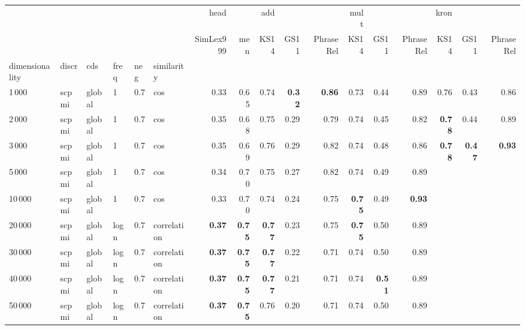 \begin{tabular}{llllllrrrrrrrrrrr}
\toprule
      &       &        &   &     &             &      head &       &   add &       &           &  mult &       &           &  kron &       &           \\
      &       &        &   &     &             & SimLex999 &   men &  KS14 &  GS11 & PhraseRel &  KS14 &  GS11 & PhraseRel &  KS14 &  GS11 & PhraseRel \\
dimensionality & discr & cds & freq & neg & similarity &           &       &       &       &           &       &       &           &       &       &           \\
\midrule
1\,000  & scpmi & global & 1    & 0.7 & cos         &              0.33  &  0.65 &  0.74 &  \textbf{0.32} &      \textbf{0.86} &  0.73 &  0.44 &      0.89 &  0.76 &  0.43 &      0.86 \\
2\,000  & scpmi & global & 1    & 0.7 & cos         &              0.35  &  0.68 &  0.75 &  0.29 &      0.79 &  0.74 &  0.45 &      0.82 &  \textbf{0.78} &  0.44 &      0.89 \\
3\,000  & scpmi & global & 1    & 0.7 & cos         &              0.35  &  0.69 &  0.76 &  0.29 &      0.82 &  0.74 &  0.48 &      0.86 &  \textbf{0.78} &  \textbf{0.47} &      \textbf{0.93} \\
5\,000  & scpmi & global & 1    & 0.7 & cos         &              0.34  &  0.70 &  0.75 &  0.27 &      0.82 &  0.74 &  0.49 &      0.89 &       &       &           \\
10\,000 & scpmi & global & 1    & 0.7 & cos         &              0.33  &  0.70 &  0.74 &  0.24 &      0.75 &  \textbf{0.75} &  0.49 &      \textbf{0.93} &       &       &           \\
20\,000 & scpmi & global & logn & 0.7 & correlation &      \textbf{0.37} &  \textbf{0.75} &  \textbf{0.77} &  0.23 &      0.75 &  \textbf{0.75} &  0.50 &      0.89 &       &       &           \\
30\,000 & scpmi & global & logn & 0.7 & correlation &      \textbf{0.37} &  \textbf{0.75} &  \textbf{0.77} &  0.22 &      0.71 &  0.74 &  0.50 &      0.89 &       &       &           \\
40\,000 & scpmi & global & logn & 0.7 & correlation &      \textbf{0.37} &  \textbf{0.75} &  \textbf{0.77} &  0.21 &      0.71 &  0.74 &  \textbf{0.51} &      0.89 &       &       &           \\
50\,000 & scpmi & global & logn & 0.7 & correlation &      \textbf{0.37} &  \textbf{0.75} &  0.76 &  0.20 &      0.71 &  0.74 &  0.50 &      0.89 &       &       &           \\
\bottomrule
\end{tabular}
